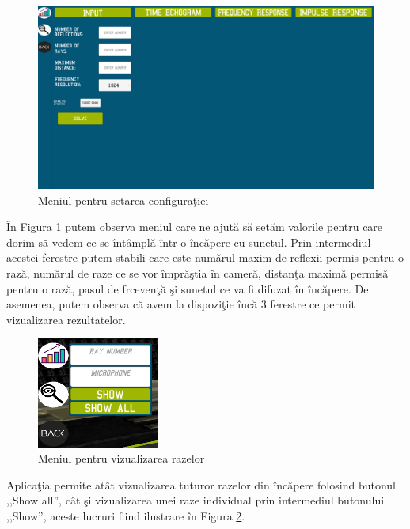 	\begin{figure}[!htb]
		\centering
		\includegraphics[width=12cm]{imagini/input.png}
		\caption{Meniul pentru setarea configura\c{t}iei}
		\label{inputFig}
	\end{figure}

	\^{I}n Figura \ref{inputFig} putem observa meniul care ne ajut\u{a} s\u{a} set\u{a}m valorile pentru care dorim s\u{a} vedem ce se \^{i}nt\^{a}mpl\u{a} \^{i}ntr-o \^{i}nc\u{a}pere cu sunetul. Prin intermediul acestei ferestre putem stabili care este num\u{a}rul maxim de reflexii permis pentru o raz\u{a}, num\u{a}rul de raze ce se vor \^{i}mpr\u{a}\c{s}tia \^{i}n camer\u{a}, distan\c{t}a maxim\u{a} permis\u{a} pentru o raz\u{a}, pasul de frceven\c{t}\u{a} \c{s}i sunetul ce va fi difuzat \^{i}n \^{i}nc\u{a}pere. De asemenea, putem observa c\u{a} avem la dispozi\c{t}ie \^{i}nc\u{a} 3 ferestre ce permit vizualizarea rezultatelor.
	\bigskip
	
	\begin{figure}[!htb]
		\centering
		\includegraphics[width=4cm]{imagini/rayMenu.png}
		\caption{Meniul pentru vizualizarea razelor}
		\label{rayMenu}
	\end{figure}

	Aplica\c{t}ia permite at\^{a}t vizualizarea tuturor razelor din \^{i}nc\u{a}pere folosind butonul ,,Show all'', c\^{a}t \c{s}i vizualizarea unei raze individual prin intermediul butonului ,,Show'', aceste lucruri fiind ilustrare \^{i}n Figura \ref{rayMenu}.
	\bigskip
	
